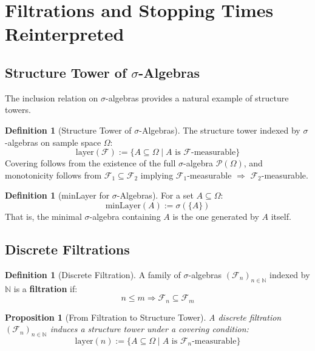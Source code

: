 \documentclass[11pt,a4paper]{article}
\theoremstyle{plain}
\newtheorem{proposition}[theorem]{Proposition}
\theoremstyle{definition}
\newtheorem{definition}[theorem]{Definition}
\newcommand{\NN}{\mathbb{N}}
\newcommand{\FF}{\mathcal{F}}
\newcommand{\minmark}{\mathrm{minLayer}}
\newcommand{\layer}{\mathrm{layer}}
\begin{document}
\section{Filtrations and Stopping Times Reinterpreted}
\label{sec:filtration}

\subsection{Structure Tower of $\sigma$-Algebras}

The inclusion relation on $\sigma$-algebras provides a natural example 
of structure towers.

\begin{definition}[Structure Tower of $\sigma$-Algebras]
\label{def:sigma-tower}
The structure tower indexed by $\sigma$-algebras on sample space $\Omega$:
\[
  \layer(\FF) := \{A \subseteq \Omega \mid A \text{ is } \FF\text{-measurable}\}
\]
Covering follows from the existence of the full $\sigma$-algebra $\mathcal{P}(\Omega)$,
and monotonicity follows from $\FF_1 \subseteq \FF_2$ implying 
$\FF_1$-measurable $\Rightarrow$ $\FF_2$-measurable.
\end{definition}

\begin{definition}[minLayer for $\sigma$-Algebras]
For a set $A \subseteq \Omega$:
\[
  \minmark(A) := \sigma(\{A\})
\]
That is, the minimal $\sigma$-algebra containing $A$ is the one generated by $A$ itself.
\end{definition}

\subsection{Discrete Filtrations}

\begin{definition}[Discrete Filtration]
\label{def:filtration}
A family of $\sigma$-algebras $(\FF_n)_{n \in \NN}$ indexed by $\NN$ is a
\textbf{filtration} if:
\[
  n \leq m \Rightarrow \FF_n \subseteq \FF_m
\]
\end{definition}

\begin{proposition}[From Filtration to Structure Tower]
\label{prop:filtration-to-tower}
A discrete filtration $(\FF_n)_{n \in \NN}$ induces a structure tower 
under a covering condition:
\[
  \layer(n) := \{A \subseteq \Omega \mid A \text{ is } \FF_n\text{-measurable}\}
\]
\end{proposition}
\end{document}
